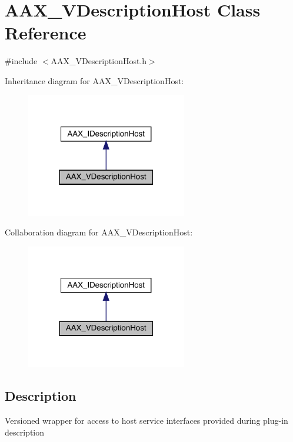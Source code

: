 \hypertarget{a01909}{}\section{A\+A\+X\+\_\+\+V\+Description\+Host Class Reference}
\label{a01909}


{\ttfamily \#include $<$A\+A\+X\+\_\+\+V\+Description\+Host.\+h$>$}



Inheritance diagram for A\+A\+X\+\_\+\+V\+Description\+Host\+:
\nopagebreak
\begin{figure}[H]
\begin{center}
\leavevmode
\includegraphics[width=199pt]{a01908}
\end{center}
\end{figure}


Collaboration diagram for A\+A\+X\+\_\+\+V\+Description\+Host\+:
\nopagebreak
\begin{figure}[H]
\begin{center}
\leavevmode
\includegraphics[width=199pt]{a01907}
\end{center}
\end{figure}


\subsection{Description}
Versioned wrapper for access to host service interfaces provided during plug-\/in description

